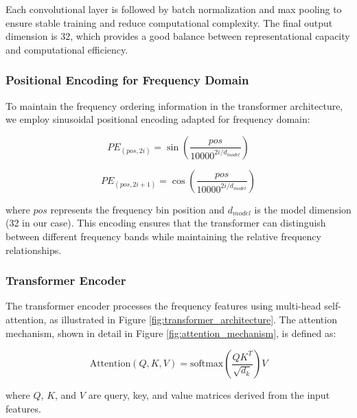 \documentclass[journal,10pt]{IEEEtran}
\begin{document}
Each convolutional layer is followed by batch normalization and max pooling to ensure stable training and reduce computational complexity. The final output dimension is 32, which provides a good balance between representational capacity and computational efficiency.

\subsubsection{Positional Encoding for Frequency Domain}

To maintain the frequency ordering information in the transformer architecture, we employ sinusoidal positional encoding adapted for frequency domain:

\begin{equation}
PE_{(pos, 2i)} = \sin\left(\frac{pos}{10000^{2i/d_{model}}}\right)
\end{equation}

\begin{equation}
PE_{(pos, 2i+1)} = \cos\left(\frac{pos}{10000^{2i/d_{model}}}\right)
\end{equation}

where $pos$ represents the frequency bin position and $d_{model}$ is the model dimension (32 in our case). This encoding ensures that the transformer can distinguish between different frequency bands while maintaining the relative frequency relationships.

\subsubsection{Transformer Encoder}

The transformer encoder processes the frequency features using multi-head self-attention, as illustrated in Figure \ref{fig:transformer_architecture}. The attention mechanism, shown in detail in Figure \ref{fig:attention_mechanism}, is defined as:

\begin{equation}
\text{Attention}(Q, K, V) = \text{softmax}\left(\frac{QK^T}{\sqrt{d_k}}\right)V
\end{equation}

where $Q$, $K$, and $V$ are query, key, and value matrices derived from the input features.
\end{document}
